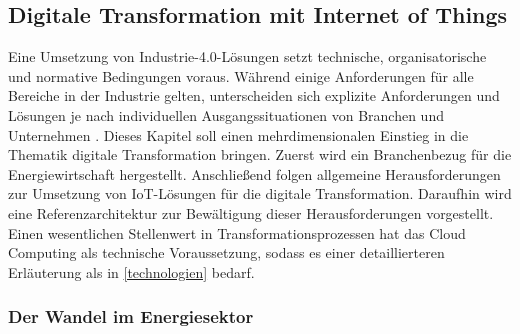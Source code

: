 \subsection{Digitale Transformation mit Internet of Things}

Eine Umsetzung von Industrie-4.0-Lösungen setzt technische, organisatorische und normative Bedingungen voraus. Während einige Anforderungen für alle Bereiche in der Industrie gelten, unterscheiden sich explizite Anforderungen und Lösungen je nach individuellen Ausgangssituationen von Branchen und Unternehmen \citep{Bauer2014}. Dieses Kapitel soll einen mehrdimensionalen Einstieg in die Thematik digitale Transformation bringen. Zuerst wird ein Branchenbezug für die Energiewirtschaft hergestellt. Anschließend folgen allgemeine Herausforderungen zur Umsetzung von IoT-Lösungen für die digitale Transformation. Daraufhin wird eine Referenzarchitektur zur Bewältigung dieser Herausforderungen vorgestellt. Einen wesentlichen Stellenwert in Transformationsprozessen hat das Cloud Computing als technische Voraussetzung, sodass es einer detaillierteren Erläuterung als in \ref{technologien} bedarf. 

\subsubsection{Der Wandel im Energiesektor} \label{energy}

